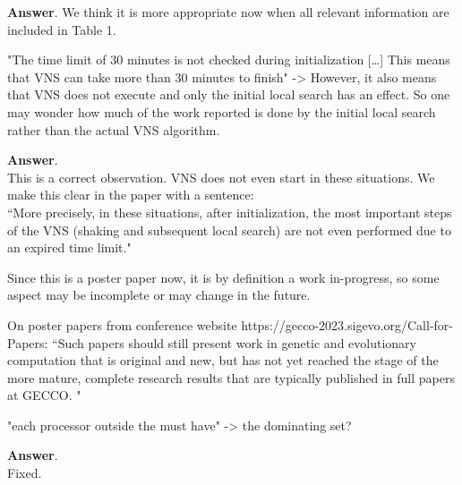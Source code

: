 \documentclass [11pt]{scrartcl}
\begin{document}
\textbf{Answer}.
We think it is more appropriate now when all relevant information are included in Table 1.

\begin{leftbar}
"The time limit of 30 minutes is not checked during initialization […] This means that VNS can take more than 30 minutes to finish"
-> However, it also means that VNS does not execute and only the initial local search has an effect. So one may wonder how much of the work reported is done by the initial local search rather than the actual VNS algorithm.
\end{leftbar}

\textbf{Answer}. \\
This is a correct observation. VNS does not even start in these situations. 
We make this clear in the paper with a sentence:\\
``More precisely, in these situations, after initialization, the most important steps of the VNS (shaking and subsequent local search) are not even performed due to an expired time limit."
 
Since this is a poster paper now, it is by definition a work in-progress, so some aspect may be incomplete or may change in the future. 

On poster papers from conference website https://gecco-2023.sigevo.org/Call-for-Papers: ``Such papers should still present work in genetic and evolutionary computation that is original and new, but has not yet reached the stage of the more mature, complete research results that are typically published in full papers at GECCO. " 

\begin{leftbar}
"each processor outside the must have" -> the dominating set?
\end{leftbar}

\textbf{Answer}. \\
Fixed. 
\end{document}
